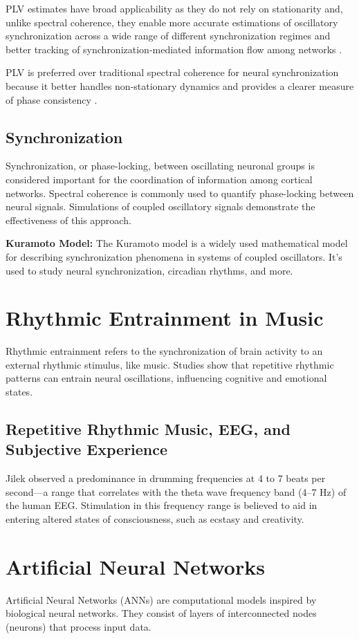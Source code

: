 \documentclass{article}
\begin{document}
PLV estimates have broad applicability as they do not rely on stationarity and, unlike spectral coherence, they enable more accurate estimations of oscillatory synchronization across a wide range of different synchronization regimes and better tracking of synchronization-mediated information flow among networks \cite{Lowet2016}.

PLV is preferred over traditional spectral coherence for neural synchronization because it better handles non-stationary dynamics and provides a clearer measure of phase consistency \cite{Schmidt2014}.


\subsection{Synchronization}
Synchronization, or phase-locking, between oscillating neuronal groups is considered important for the coordination of information among cortical networks. Spectral coherence is commonly used to quantify phase-locking between neural signals. Simulations of coupled oscillatory signals demonstrate the effectiveness of this approach.

\textbf{Kuramoto Model:} The Kuramoto model is a widely used mathematical model for describing synchronization phenomena in systems of coupled oscillators. It’s used to study neural synchronization, circadian rhythms, and more.

\section{Rhythmic Entrainment in Music}
Rhythmic entrainment refers to the synchronization of brain activity to an external rhythmic stimulus, like music. Studies show that repetitive rhythmic patterns can entrain neural oscillations, influencing cognitive and emotional states.

\subsection{Repetitive Rhythmic Music, EEG, and Subjective Experience}
Jilek observed a predominance in drumming frequencies at 4 to 7 beats per second—a range that correlates with the theta wave frequency band (4–7 Hz) of the human EEG. Stimulation in this frequency range is believed to aid in entering altered states of consciousness, such as ecstasy and creativity.

\section{Artificial Neural Networks}
Artificial Neural Networks (ANNs) are computational models inspired by biological neural networks. They consist of layers of interconnected nodes (neurons) that process input data.
\end{document}

